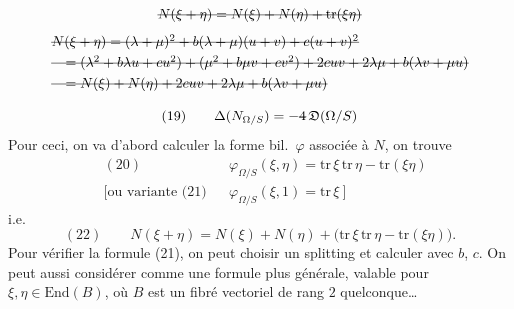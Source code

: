 \documentclass[11pt,a4paper]{article}
\begin{document}
 
\[
\text{\struck{$N(\xi + \eta) = N(\xi) + N(\eta) + \mathrm{tr}(\xi\eta)$}}
\]
\[
\begin{aligned}
&\text{\struck{$N(\xi + \eta) = (\lambda + \mu)^2 + b(\lambda + \mu)(u + v) + c(u + v)^2$}}\\
&\text{\struck{$\quad = (\lambda^2 + b\lambda u + cu^2) + (\mu^2 + b\mu v + cv^2) + 2cuv + 2\lambda\mu + b(\lambda v + \mu u)$}}\\
&\text{\struck{$\quad = N(\xi) + N(\eta) + 2cuv + 2\lambda\mu + b(\lambda v + \mu u)$}}
\end{aligned}
\]

\[
(19)\qquad \Delta(N_{\Omega/S}) = -\text{\struck{$4$}}\,\mathfrak{D}(\Omega/S)
\]
Pour ceci, on va d'abord calculer la forme bil.\ $\varphi$ associée à $N$, on trouve
\[
\begin{aligned}
&(20) && \varphi_{\Omega/S}(\xi, \eta) = \mathrm{tr}\,\xi\, \mathrm{tr}\,\eta - \mathrm{tr}(\xi\eta)\\
&\text{[ou variante (21)} && \varphi_{\Omega/S}(\xi, 1) = \mathrm{tr}\,\xi\ ]
\end{aligned}
\]
i.e.
\[
(22)\qquad N(\xi + \eta) = N(\xi) + N(\eta) + \bigl(\mathrm{tr}\,\xi\,\mathrm{tr}\,\eta - \mathrm{tr}(\xi\eta)\bigr) .
\]
Pour vérifier la formule (21), on peut choisir un splitting et calculer avec $b$, $c$. On peut aussi considérer comme \struck{\ill{}}  une formule plus générale, valable pour $\xi, \eta \in \mathrm{End}(B)$, où $B$ est un fibré vectoriel de rang $2$ quelconque…
\end{document}
